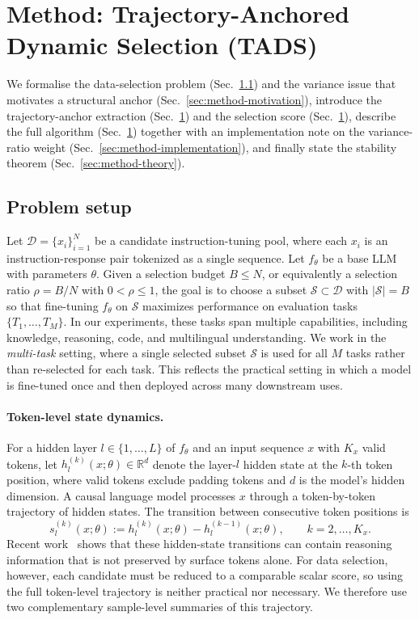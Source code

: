 \section{Method: Trajectory-Anchored Dynamic Selection (TADS)}
\label{sec:method}

We formalise the data-selection problem
(Sec.~\ref{sec:problem-setup}) and the variance issue that motivates
a structural anchor (Sec.~\ref{sec:method-motivation}), introduce
the trajectory-anchor extraction
(Sec.~\ref{sec:method}) and the selection score
(Sec.~\ref{sec:method}), describe the full algorithm
(Sec.~\ref{sec:method}) together with an implementation note
on the variance-ratio weight
(Sec.~\ref{sec:method-implementation}), and finally state the
stability theorem (Sec.~\ref{sec:method-theory}).


\subsection{Problem setup}
\label{sec:problem-setup}

Let $\mathcal{D}=\{x_i\}_{i=1}^N$ be a candidate instruction-tuning
pool, where each $x_i$ is an instruction-response pair tokenized as
a single sequence. Let $f_\theta$ be a base LLM with parameters
$\theta$. Given a selection budget $B \le N$, or equivalently a
selection ratio $\rho=B/N$ with $0<\rho\le1$, the goal is to choose
a subset $\mathcal{S}\subset\mathcal{D}$ with $|\mathcal{S}|=B$ so
that fine-tuning $f_\theta$ on $\mathcal{S}$ maximizes performance
on evaluation tasks $\{T_1,\ldots,T_M\}$. In our experiments, these
tasks span multiple capabilities, including knowledge, reasoning,
code, and multilingual understanding. We work in the \emph{multi-task}
setting, where a single selected subset $\mathcal{S}$ is used for
all $M$ tasks rather than re-selected for each task. This reflects
the practical setting in which a model is fine-tuned once and then
deployed across many downstream uses.

\paragraph{Token-level state dynamics.}
For a hidden layer $l \in \{1,\ldots,L\}$ of $f_\theta$ and an
input sequence $x$ with $K_x$ valid tokens, let
$h_l^{(k)}(x;\theta)\in\mathbb{R}^d$ denote the layer-$l$ hidden
state at the $k$-th token position, where valid tokens exclude
padding tokens and $d$ is the model's hidden dimension. A causal
language model processes $x$ through a token-by-token trajectory of
hidden states. The transition between consecutive token positions is
\begin{equation}
  s_l^{(k)}(x;\theta)
  :=
  h_l^{(k)}(x;\theta)-h_l^{(k-1)}(x;\theta),
  \qquad k=2,\ldots,K_x .
  \label{eq:transition}
\end{equation}
Recent work~\citep{tang2025sde} shows that these hidden-state
transitions can contain reasoning information that is not preserved
by surface tokens alone. For data selection, however, each candidate
must be reduced to a comparable scalar score, so using the full
token-level trajectory is neither practical nor necessary. We
therefore use two complementary sample-level summaries of this
trajectory. 

